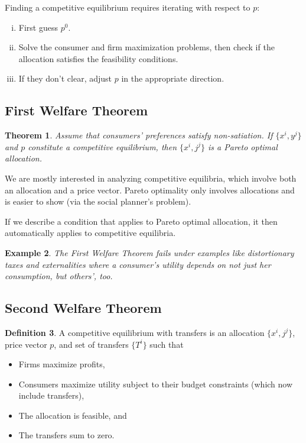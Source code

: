 \documentclass{tufte-handout}
\newtheorem{thm}{Theorem}[subsection]
\newtheorem{ex}[thm]{Example}
\theoremstyle{definition}
\newtheorem{defn}[thm]{Definition}
\begin{document}
Finding a competitive equilibrium requires iterating with respect to $p$:
\begin{enumerate}[(i)]
	\item First guess $p^0$.
	\item Solve the consumer and firm maximization problems, then check if the allocation satisfies the feasibility conditions.
	\item If they don't clear, adjust $p$ in the appropriate direction.
\end{enumerate}

\subsection{First Welfare Theorem}

\begin{thm}
	Assume that consumers' preferences satisfy non-satiation. If $\{x^i, y^j\}$ and $p$ constitute a competitive equilibrium, then $\{x^i, j^j\}$ is a Pareto optimal allocation.
\end{thm}

We are mostly interested in analyzing competitive equilibria, which involve both an allocation and a price vector. Pareto optimality only involves allocations and is easier to show (via the social planner's problem). 

If we describe a condition that applies to Pareto optimal allocation, it then automatically applies to competitive equilibria.

\begin{ex}
	The First Welfare Theorem fails under examples like distortionary taxes and externalities where a consumer's utility depends on not just her consumption, but others', too.
\end{ex}

\subsection{Second Welfare Theorem}

\begin{defn}
	A competitive equilibrium with transfers is an allocation $\{x^i, j^j\}$, price vector $p$, and set of transfers $\{T^i\}$ such that
	\begin{itemize}
		\item Firms maximize profits,
		\item Consumers maximize utility subject to their budget constraints (which now include transfers),
		\item The allocation is feasible, and
		\item The transfers sum to zero.
	\end{itemize}
\end{defn}
\end{document}
